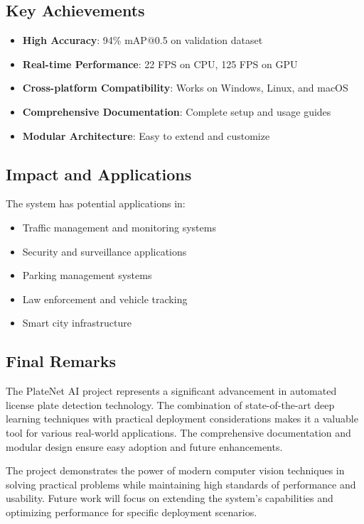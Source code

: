 \documentclass[12pt,a4paper]{article}
\begin{document}
\subsection{Key Achievements}

\begin{itemize}
    \item \textbf{High Accuracy}: 94\% mAP@0.5 on validation dataset
    \item \textbf{Real-time Performance}: 22 FPS on CPU, 125 FPS on GPU
    \item \textbf{Cross-platform Compatibility}: Works on Windows, Linux, and macOS
    \item \textbf{Comprehensive Documentation}: Complete setup and usage guides
    \item \textbf{Modular Architecture}: Easy to extend and customize
\end{itemize}

\subsection{Impact and Applications}

The system has potential applications in:

\begin{itemize}
    \item Traffic management and monitoring systems
    \item Security and surveillance applications
    \item Parking management systems
    \item Law enforcement and vehicle tracking
    \item Smart city infrastructure
\end{itemize}

\subsection{Final Remarks}

The PlateNet AI project represents a significant advancement in automated license plate detection technology. The combination of state-of-the-art deep learning techniques with practical deployment considerations makes it a valuable tool for various real-world applications. The comprehensive documentation and modular design ensure easy adoption and future enhancements.

The project demonstrates the power of modern computer vision techniques in solving practical problems while maintaining high standards of performance and usability. Future work will focus on extending the system's capabilities and optimizing performance for specific deployment scenarios.
\end{document}
